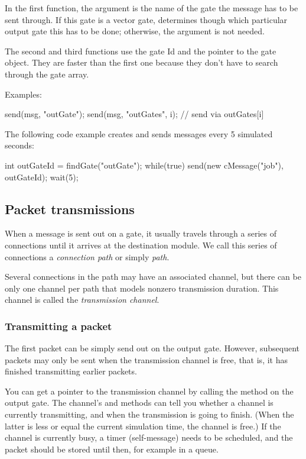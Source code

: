 In the first function, the argument  is the name of
the gate the message has to be sent through. If this gate is
a vector gate,  determines though which particular output
gate this has to be done; otherwise, the  argument is not
needed.

The second and third functions use the gate Id and the pointer to the gate
object. They are faster than the first one because they don't have to
search through the gate array.

Examples:

\begin{cpp}
send(msg, "outGate");
send(msg, "outGates", i); // send via outGates[i]
\end{cpp}

The following code example creates and sends messages
every 5 simulated seconds:

\begin{cpp}
int outGateId = findGate("outGate");
while(true)
{
  send(new cMessage("job"), outGateId);
  wait(5);
}
\end{cpp}


\subsection{Packet transmissions}
\label{sec:simple-modules:packet-transmission}

When a message is sent out on a gate, it usually travels through
a series of connections until it arrives at the destination module.
We call this series of connections a \textit{connection path} or
simply \textit{path}.

Several connections in the path may have an associated channel,
but there can be only one channel per path that models nonzero
transmission duration. This channel is called the
\textit{transmission channel}.

\subsubsection{Transmitting a packet}

The first packet can be simply send out on the output gate. However,
subsequent packets may only be sent when the transmission channel
is free, that is, it has finished transmitting earlier packets.

You can get a pointer to the transmission channel by calling the
 method on the output gate.
The channel's  and 
methods can tell you whether a channel is currently transmitting,
and when the transmission is going to finish. (When the latter is
less or equal the current simulation time, the channel is free.)
If the channel is currently busy, a timer (self-message) needs to
be scheduled, and the packet should be stored until then, for example
in a queue.

